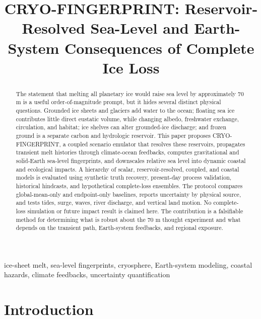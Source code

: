 \documentclass[conference]{IEEEtran}
\begin{document}
\title{CRYO-FINGERPRINT: Reservoir-Resolved Sea-Level and Earth-System Consequences of Complete Ice Loss}

\author{
}

\maketitle

\begin{abstract}
The statement that melting all planetary ice would raise sea level by approximately 70 m is a useful order-of-magnitude prompt, but it hides several distinct physical questions. Grounded ice sheets and glaciers add water to the ocean; floating sea ice contributes little direct eustatic volume, while changing albedo, freshwater exchange, circulation, and habitat; ice shelves can alter grounded-ice discharge; and frozen ground is a separate carbon and hydrologic reservoir. This paper proposes CRYO-FINGERPRINT, a coupled scenario emulator that resolves these reservoirs, propagates transient melt histories through climate-ocean feedbacks, computes gravitational and solid-Earth sea-level fingerprints, and downscales relative sea level into dynamic coastal and ecological impacts. A hierarchy of scalar, reservoir-resolved, coupled, and coastal models is evaluated using synthetic truth recovery, present-day process validation, historical hindcasts, and hypothetical complete-loss ensembles. The protocol compares global-mean-only and endpoint-only baselines, reports uncertainty by physical source, and tests tides, surge, waves, river discharge, and vertical land motion. No complete-loss simulation or future impact result is claimed here. The contribution is a falsifiable method for determining what is robust about the 70 m thought experiment and what depends on the transient path, Earth-system feedbacks, and regional exposure.
\end{abstract}

\begin{IEEEkeywords}
ice-sheet melt, sea-level fingerprints, cryosphere, Earth-system modeling, coastal hazards, climate feedbacks, uncertainty quantification
\end{IEEEkeywords}

\section{Introduction}
\end{document}
